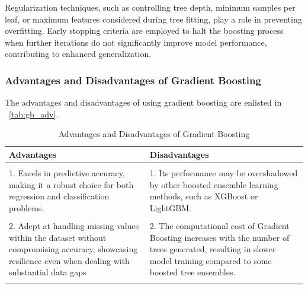 Regularization techniques, such as controlling tree depth, minimum samples per leaf, or maximum features considered during tree fitting, 
play a role in preventing overfitting. Early stopping criteria are employed to halt the boosting process when further iterations do not significantly improve model performance, contributing to enhanced generalization.



\subsubsection{Advantages and Disadvantages of Gradient Boosting}
The advantages and disadvantages of using gradient boosting are enlisted in ~\autoref{tab:gb_adv}.

\begin{table}[H]
    \centering
    \caption{Advantages and Disadvantages of Gradient Boosting}
    \label{tab:gb_adv}
    \begin{tabularx}{\textwidth}{X|X}
        \hline
        \textbf{Advantages}                                                                                                                                                                                                              & \textbf{Disadvantages}                                                                                                                                                   \\
        \hline                                                                                                                                                                                                                                                                                                                                                                                                      \\
        1. Excels in predictive accuracy, making it a robust choice for both regression and classification problems.                                                                                                                     & 1. Its performance may be overshadowed by other boosted ensemble learning methods, such as XGBoost or LightGBM.                                                          \\ \\
        2. Adept at handling missing values within the dataset without compromising accuracy, showcasing resilience even when dealing with substantial data gaps                                                                         & 2. The computational cost of Gradient Boosting increases with the number of trees generated, resulting in slower model training compared to some boosted tree ensembles. \\ \\

\end{tabularx}
\end{table}
